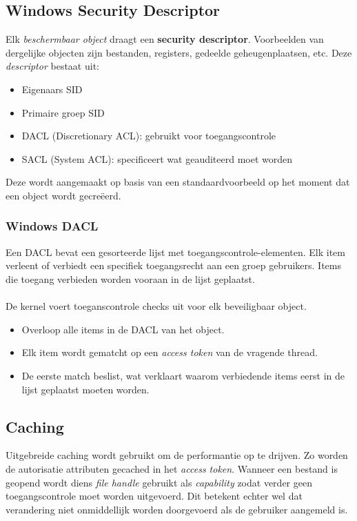 \documentclass[../main.tex]{subfiles}
\begin{document}
\subsection{Windows Security Descriptor}
Elk \textit{beschermbaar object} draagt een \textbf{security descriptor}. Voorbeelden van dergelijke objecten zijn bestanden, registers, gedeelde geheugenplaatsen, etc. Deze \textit{descriptor} bestaat uit:
\begin{itemize}
	\item Eigenaars SID
	\item Primaire groep SID
	\item DACL (Discretionary ACL): gebruikt voor toegangscontrole
	\item SACL (System ACL): specificeert wat geauditeerd moet worden
\end{itemize}
Deze wordt aangemaakt op basis van een standaardvoorbeeld op het moment dat een object wordt gecreëerd. 

\subsubsection{Windows DACL}
Een DACL bevat een gesorteerde lijst met toegangscontrole-elementen. Elk item verleent of verbiedt een specifiek toegangsrecht aan een groep gebruikers. Items die toegang verbieden worden vooraan in de lijst geplaatst.
\\\\
De kernel voert toeganscontrole checks uit voor elk beveiligbaar object.
\begin{itemize}
	\item Overloop alle items in de DACL van het object.
	\item Elk item wordt gematcht op een \textit{access token} van de vragende thread.
	\item De eerste match beslist, wat verklaart waarom verbiedende items eerst in de lijst geplaatst moeten worden.
\end{itemize}

\subsection{Caching}
Uitgebreide caching wordt gebruikt om de performantie op te drijven. Zo worden de autorisatie attributen gecached in het \textit{access token}. Wanneer een bestand is geopend wordt diens \textit{file handle} gebruikt als \textit{capability} zodat verder geen toegangscontrole moet worden uitgevoerd. Dit betekent echter wel dat verandering niet onmiddellijk worden doorgevoerd als de gebruiker aangemeld is.
\end{document}

